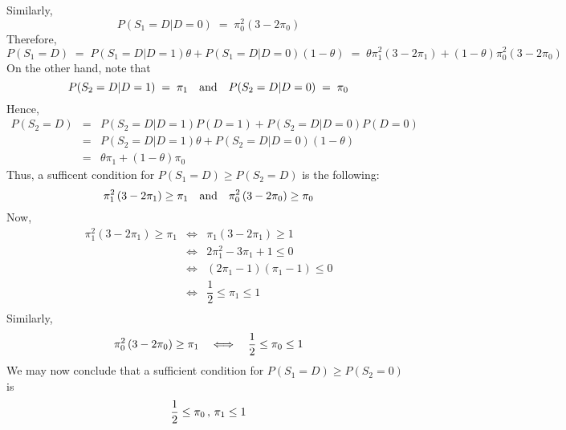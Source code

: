 Similarly,
\begin{equation*}
P(S_{1} = D \vert D = 0) \;=\; \pi_{0}^{2}\left(3 - 2\pi_{0}\right)
\end{equation*}
Therefore,
\begin{equation*}
P(S_{1} = D)
\;=\; P(S_{1} = D \vert D = 1)\theta + P(S_{1} = D \vert D = 0)(1 - \theta)
\;=\; \theta\pi_{1}^{2}\left(3 - 2\pi_{1}\right) + (1 - \theta)\pi_{0}^{2}\left(3 - 2\pi_{0}\right)
\end{equation*}
On the other hand, note that
\begin{equation*}
P(S_{2} = D \vert D = 1) \; = \; \pi_{1}
\quad\textnormal{and}\quad
P(S_{2} = D \vert D = 0) \; = \; \pi_{0}
\end{equation*}
Hence,
\begin{eqnarray*}
P(S_{2} = D)
& = & P(S_{2} = D \vert D = 1)P(D =1) + P(S_{2} = D \vert D = 0)P(D=0) \\
& = & P(S_{2} = D \vert D = 1)\theta + P(S_{2} = D \vert D = 0)(1 - \theta) \\
& = & \theta\pi_{1} + (1 - \theta)\pi_{0}
\end{eqnarray*}
Thus, a sufficent condition for $P(S_{1} = D) \geq P(S_{2} = D)$ is the following:
\begin{equation*}
\pi_{1}^{2}\left(3 - 2\pi_{1}\right) \geq \pi_{1}
\quad\textnormal{and}\quad
\pi_{0}^{2}\left(3 - 2\pi_{0}\right) \geq \pi_{0}
\end{equation*}
Now,
\begin{eqnarray*}
                      \pi_{1}^{2}\left(3 - 2\pi_{1}\right) \geq \pi_{1}
&\Longleftrightarrow& \pi_{1}\left(3 - 2\pi_{1}\right) \geq 1 \\
&\Longleftrightarrow& 2\pi_{1}^{2} - 3\pi_{1} + 1 \leq 0 \\
&\Longleftrightarrow& (2\pi_{1} - 1)(\pi_{1} - 1) \leq 0 \\
&\Longleftrightarrow& \dfrac{1}{2} \leq \pi_{1} \leq 1 \\
\end{eqnarray*}
Similarly,
\begin{equation*}
\pi_{0}^{2}\left(3 - 2\pi_{0}\right) \geq \pi_{1}
\quad\Longleftrightarrow\quad
\dfrac{1}{2} \leq \pi_{0} \leq 1 \\
\end{equation*}
We may now conclude that a sufficient condition for $P(S_{1} = D) \geq P(S_{2} = 0)$ is
\begin{equation*}
\dfrac{1}{2} \leq \pi_{0} \,,\, \pi_{1} \leq 1 \\
\end{equation*}

